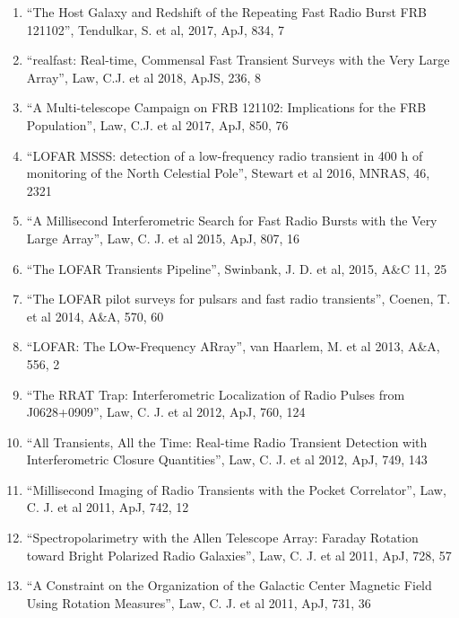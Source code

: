 \documentclass[11pt]{article}
\begin{document}
\begin{enumerate}
    \item ``The Host Galaxy and Redshift of the Repeating Fast Radio Burst FRB 121102'', Tendulkar, S. et al, 2017, ApJ, 834, 7

    \item ``realfast: Real-time, Commensal Fast Transient Surveys with the Very Large Array'', Law, C.J. et al 2018, ApJS, 236, 8

    \item ``A Multi-telescope Campaign on FRB 121102: Implications for the FRB Population'', Law, C.J. et al 2017, ApJ, 850, 76

    \item ``LOFAR MSSS: detection of a low-frequency radio transient in 400 h of monitoring of the North Celestial Pole'', Stewart et al 2016, MNRAS, 46, 2321

    \item ``A Millisecond Interferometric Search for Fast Radio Bursts with the Very Large Array'', Law, C. J. et al 2015, ApJ, 807, 16

    \item ``The LOFAR Transients Pipeline'', Swinbank, J. D. et al, 2015, A\&C 11, 25

    \item ``The LOFAR pilot surveys for pulsars and fast radio transients'', Coenen, T. et al 2014, A\&A, 570, 60

    \item ``LOFAR: The LOw-Frequency ARray'', van Haarlem, M. et al 2013, A\&A, 556, 2

    \item ``The RRAT Trap: Interferometric Localization of Radio Pulses from J0628+0909'', Law, C. J. et al 2012, ApJ, 760, 124

    \item ``All Transients, All the Time: Real-time Radio Transient Detection with Interferometric Closure Quantities'',  Law, C. J. et al 2012, ApJ, 749, 143

    \item ``Millisecond Imaging of Radio Transients with the Pocket Correlator'',  Law, C. J. et al 2011, ApJ, 742, 12

    \item ``Spectropolarimetry with the Allen Telescope Array:  Faraday Rotation toward Bright Polarized Radio Galaxies'',  Law, C. J. et al 2011, ApJ, 728, 57

    \item ``A Constraint on the Organization of the Galactic Center Magnetic Field Using Rotation Measures'',  Law, C. J. et al 2011, ApJ, 731, 36


\end{enumerate}
\end{document}
